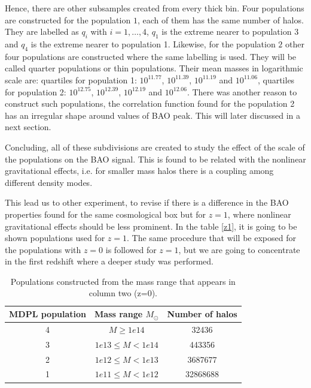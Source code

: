Hence, there are other subsamples created from every thick bin.
Four populations are constructed for the population $1$,  
each of them has the same number of halos. %
They are labelled as $q_i$ with $i=1,\dots,4$, $q_1$ is the extreme 
nearer to population 3 and $q_4$ is the extreme nearer to population 1. 
Likewise, for the population $2$ other four populations are constructed where
the same labelling is used. They will be called quarter populations or thin
populations. 
Their mean masses in logarithmic scale are: quartiles for population 1: 
$10^{11.77}$, $10^{11.39}$, $10^{11.19}$ and $10^{11.06}$, quartiles for population 2:
$10^{12.75}$, $10^{12.39}$, $10^{12.19}$ and $10^{12.06}$.
There was another reason to construct such populations, the correlation function
found for the population 2 has an irregular shape around values of BAO peak. This
will later discussed in a next section. 

Concluding, all of these subdivisions are created to study the effect of the scale of the populations 
on the BAO signal. This is found to be related with the nonlinear gravitational effects, i.e.
for smaller mass halos there is a coupling among different density modes. 

This lead us to other experiment, to revise if there is a difference in the BAO properties
found for the same cosmological box but for $z=1$, where nonlinear gravitational effects
should be less prominent. In the table \ref{z1}, it is going to be shown populations used 
for $z=1$. The same procedure that will be exposed for the populations with $z=0$ is followed
for $z=1$, but we are going to concentrate in the first redshift where a deeper study 
was performed. 

\begin{table}
\begin{center}
  \begin{tabular}{ | c | c | c | }
    \hline \hline
    MDPL population & Mass range $M_{\odot}$& Number of halos \\ \hline \hline
    4 & $ M \geqslant 1e14$ & 32436 \\ \hline
    3 & $ 1e13 \leq M < 1e14 $ & 443356\\ \hline
    2 & $ 1e12 \leq M < 1e13$ & 3687677\\ \hline
    1 & $ 1e11 \leq M < 1e12$ & 32868688 \\ \hline
  \end{tabular}  
   \caption{ Populations constructed from the mass range that appears in column two (z=0). }
\label{pophalos}
\end{center}
\end{table}


